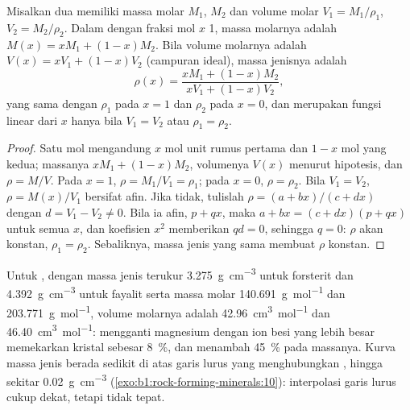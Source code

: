\begin{proposition}\label{prop:b1:rock-forming-minerals:ideal-mixing}
Misalkan dua  memiliki massa molar $M_1$, $M_2$ dan volume molar
$V_1 = M_1/\rho_1$, $V_2 = M_2/\rho_2$. Dalam  dengan fraksi mol
$x$  1, massa molarnya adalah
$M(x) = x M_1 + (1 - x) M_2$. Bila volume molarnya adalah
$V(x) = x V_1 + (1 - x) V_2$ (campuran ideal), massa jenisnya adalah
\[
  \rho(x) = \frac{x M_1 + (1 - x) M_2}{x V_1 + (1 - x) V_2},
\]
yang sama dengan $\rho_1$ pada $x = 1$ dan $\rho_2$ pada $x = 0$, dan merupakan fungsi linear dari $x$ hanya bila $V_1 = V_2$ atau $\rho_1 = \rho_2$.
\end{proposition}

\begin{proof}
Satu mol  mengandung $x$ mol unit rumus pertama dan $1 - x$ mol yang kedua; massanya $x M_1 + (1 - x) M_2$, volumenya $V(x)$ menurut hipotesis, dan $\rho = M/V$. Pada $x = 1$, $\rho = M_1/V_1 = \rho_1$; pada $x = 0$, $\rho = \rho_2$. Bila $V_1 = V_2$, $\rho = M(x)/V_1$ bersifat afin. Jika tidak, tulislah $\rho = (a + bx)/(c + dx)$ dengan $d = V_1 - V_2 \ne 0$. Bila ia afin, $p + qx$, maka $a + bx = (c + dx)(p + qx)$ untuk semua $x$, dan koefisien $x^2$ memberikan $qd = 0$, sehingga $q = 0$: $\rho$ akan konstan, $\rho_1 = \rho_2$. Sebaliknya, massa jenis  yang sama membuat $\rho$ konstan.
\end{proof}

Untuk , dengan massa jenis terukur \qty{3.275}{g.cm^{-3}} untuk forsterit dan \qty{4.392}{g.cm^{-3}} untuk fayalit serta massa molar \qty{140.691}{g.mol^{-1}} dan \qty{203.771}{g.mol^{-1}}, volume molarnya adalah \qty{42.96}{cm^3.mol^{-1}} dan \qty{46.40}{cm^3.mol^{-1}}: mengganti magnesium dengan ion besi yang lebih besar memekarkan kristal sebesar \qty{8}{\percent}, dan menambah \qty{45}{\percent} pada massanya. Kurva massa jenis berada sedikit di atas garis lurus yang menghubungkan , hingga sekitar
\qty{0.02}{g.cm^{-3}} (\cref{exo:b1:rock-forming-minerals:10}): interpolasi garis lurus cukup dekat, tetapi tidak tepat.

